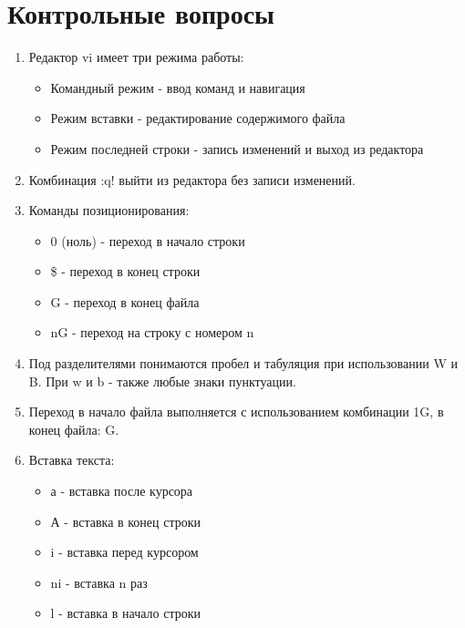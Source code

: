 \documentclass[
  12pt,
  a4paper,
]{scrreprt}
\providecommand{\tightlist}{%
  \setlength{\itemsep}{0pt}\setlength{\parskip}{0pt}}
\begin{document}
\hypertarget{ux43aux43eux43dux442ux440ux43eux43bux44cux43dux44bux435-ux432ux43eux43fux440ux43eux441ux44b}{%
\chapter{Контрольные
вопросы}\label{ux43aux43eux43dux442ux440ux43eux43bux44cux43dux44bux435-ux432ux43eux43fux440ux43eux441ux44b}}

\begin{enumerate}
\def\labelenumi{\arabic{enumi}.}
\item
  Редактор vi имеет три режима работы:

  \begin{itemize}
  \tightlist
  \item
    Командный режим - ввод команд и навигация
  \item
    Режим вставки - редактирование содержимого файла
  \item
    Режим последней строки - запись изменений и выход из редактора
  \end{itemize}
\item
  Комбинация :q! выйти из редактора без записи изменений.
\item
  Команды позиционирования:

  \begin{itemize}
  \tightlist
  \item
    0 (ноль) - переход в начало строки
  \item
    \$ - переход в конец строки
  \item
    G - переход в конец файла
  \item
    nG - переход на строку с номером n
  \end{itemize}
\item
  Под разделителями понимаются пробел и табуляция при использовании W и
  B. При w и b - также любые знаки пунктуации.
\item
  Переход в начало файла выполняется с использованием комбинации 1G, в
  конец файла: G.
\item
  Вставка текста:

  \begin{itemize}
  \tightlist
  \item
    а - вставка после курсора
  \item
    А - вставка в конец строки
  \item
    i - вставка перед курсором
  \item
    ni - вставка n раз
  \item
    l - вставка в начало строки
  \end{itemize}
\end{enumerate}
\end{document}
